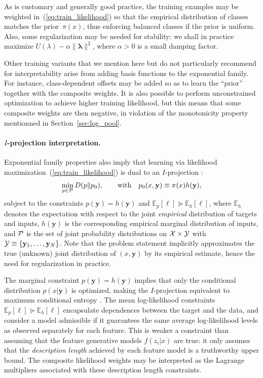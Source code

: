 \documentclass[english]{scrartcl}
\def\y{{\mathbf{y}}}
\newcommand{\blambda}{{\boldsymbol{\lambda}}}
\newcommand{\bell}{{\boldsymbol{\ell}}}
\newcommand{\E}{\mathbb{E}}
\begin{document}
As is customary and generally good practice, the training examples may be weighted in~(\ref{eq:train_likelihood}) so that the empirical distribution of classes matches the prior~$\pi(x)$, thus enforcing balanced classes if the prior is uniform. Also, some regularization may be needed for stability: we shall in practice maximize $U(\lambda)-\alpha \|\blambda\|^2$, where $\alpha>0$ is a small damping factor.

Other training variants that we mention here but do not particularly recommend for interpretability arise from adding basis functions to the exponential family. For instance, class-dependent offsets may be added so as to learn the ``prior'' together with the composite weights. It is also possible to perform unconstrained optimization to achieve higher training likelihood, but this means that some composite weights are then negative, in violation of the monotonicity property mentionned in Section~\ref{sec:log_pool}.


\paragraph{$I$-projection interpretation.}

Exponential family properties also imply that learning via likelihood maximization~(\ref{eq:train_likelihood}) is dual to an $I$-projection \cite{Csiszar-84}: 
\begin{equation}
\label{eq:i_proj}
\min_{p\in{\cal P}} D(p\|p_0),
\qquad \text{with} \quad
p_0(x,\y) \equiv \pi(x)h(\y),
\end{equation}
subject to the constraints $p(\y)=h(\y)$ and $\E_p[\bell] \succeq \E_h[\bell]$, where $\E_h$ denotes the expectation with respect to the joint {\em empirical} distribution of targets and inputs, $h(\y)$ is the corresponding empirical marginal distribution of inputs, and ${\cal P}$ is the set of joint probability distributions on ${\cal X}\times {\cal Y}$ with ${\cal Y}\equiv\{\y_1,\ldots,\y_N\}$. Note that the problem statement implicitly approximates the true (unknown) joint distribution of $(x,\y)$ by its empirical estimate, hence the need for regularization in practice.

The marginal constraint $p(\y)=h(\y)$ implies that only the conditional distribution $p(x|\y)$ is optimized, making the $I$-projection equivalent to maximum conditional entropy \cite{BergerA-96}. The mean log-likelihood constraints $\E_p[\bell] \succeq \E_h[\bell]$ encapsulate dependences between the target and the data, and consider a model admissible if it guarantees the same average log-likelihood levels as observed separately for each feature. This is weaker a constraint than assuming that the feature generative models $f(z_i|x)$ are true: it only assumes that the {\em description length} \cite{Grunwald-07} achieved by each feature model is a truthworthy upper bound. The composite likelihood weights may be interpreted as the Lagrange multipliers associated with these description length constraints. 
\end{document}
